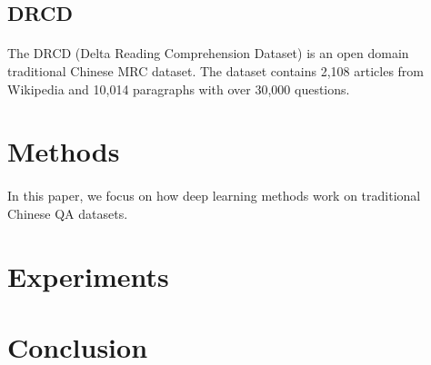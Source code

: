 \documentclass[12pt]{article}
\begin{document}
\subsection{DRCD}
\paragraph{}
The DRCD (Delta Reading Comprehension Dataset) is an open domain traditional Chinese MRC dataset. The dataset contains 2,108 articles from Wikipedia and 10,014 paragraphs with over 30,000 questions.

\section{Methods}
\paragraph{}
In this paper, we focus on how deep learning methods work on traditional Chinese QA datasets.

\section{Experiments}

\section{Conclusion}
\end{document}
